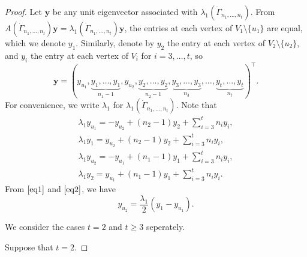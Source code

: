 \documentclass[10pt,a4paper]{amsart}
\numberwithin{equation}{section}
\begin{document}
\begin{proof}
Let $\mathbf{y}$ be any unit eigenvector associated with $\lambda_1(\dot\Gamma_{n_1, \dots, n_t})$.  
From $A(\dot\Gamma_{n_1, \dots, n_t})\mathbf{y}=\lambda_1(\dot\Gamma_{n_1, \dots, n_t})\mathbf{y}$, 
the entries at each vertex of $V_1\setminus \{u_1\}$ are equal, which we denote $y_1$. Similarly, denote by $y_2$ the entry at each vertex of $V_2\setminus \{u_2\}$, and  $y_i$ the entry at each vertex of $V_i$ for $i=3,\dots, t$, so 
\[
\mathbf{y}=(y_{u_1}, \underbrace{y_1,\dots,y_1}_{n_1-1}, y_{u_2}, \underbrace{y_2,\dots,y_2}_{n_2-1}, \underbrace{y_3,\dots,y_3}_{n_3}, \dots, \underbrace{y_t,\dots,y_t}_{n_t})^\top.
\]
For convenience, we write $\lambda_1$ for $\lambda_1(\dot\Gamma_{n_1, \dots, n_t})$.
Note that
\begin{align}
\lambda_1 y_{u_1}=-y_{u_2}+(n_2-1)y_2+\sum_{i=3}^tn_iy_i, \label{eq1}\\
\lambda_1 y_1=y_{u_2}+(n_2-1)y_2+\sum_{i=3}^tn_iy_i, \label{eq2}\\
\lambda_1 y_{u_2}=-y_{u_1}+(n_1-1)y_1+\sum_{i=3}^tn_iy_i, \label{eq3}\\
\lambda_1 y_2=y_{u_1}+(n_1-1)y_1+\sum_{i=3}^tn_iy_i. \label{eq4}
\end{align}
From $\eqref{eq1}$ and $\eqref{eq2}$, we have
\begin{equation}\label{v0}
y_{u_2}=\frac{\lambda_1}{2}(y_1-y_{u_1}).
\end{equation} 

We consider the cases $t=2$ and $t\ge 3$ seperately. 

Suppose  that $t=2$. 


\end{proof}
\end{document}
